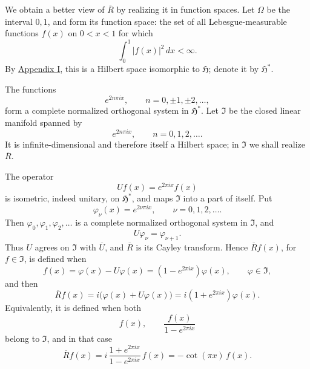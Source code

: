 ﻿\documentclass[paper=b5,fontsize=13pt,bookmarkpackage=false,twoside]{scrartcl}
\begin{document}
We obtain a better view of \(\overline R\) by realizing it in function
spaces.  Let \(\Omega\) be the interval \(0,1\), and form its function
space: the set of all Lebesgue-measurable functions \(f(x)\) on
\(0<x<1\) for which
\[
  \int_0^1|f(x)|^2\,dx<\infty.
\]
By \hyperref[app:I]{Appendix I}, this is a Hilbert space isomorphic to
\(\mathfrak H\); denote it by \(\mathfrak H^*\).

The functions
\[
  e^{2n\pi ix},\qquad n=0,\pm1,\pm2,\ldots,
\]
form a complete normalized orthogonal system in \(\mathfrak H^*\).
Let \(\mathfrak I\) be the closed linear manifold spanned by
\[
  e^{2n\pi ix},\qquad n=0,1,2,\ldots.
\]
It is infinite-dimensional and therefore itself a Hilbert space; in
\(\mathfrak I\) we shall realize \(\overline R\).

The operator
\[
  Uf(x)=e^{2\pi ix}f(x)
\]
is isometric, indeed unitary, on \(\mathfrak H^*\), and maps
\(\mathfrak I\) into a part of itself.  Put
\[
  \varphi_\nu(x)=e^{2\nu\pi ix},\qquad \nu=0,1,2,\ldots.
\]
Then \(\varphi_0,\varphi_1,\varphi_2,\ldots\) is a complete normalized
orthogonal system in \(\mathfrak I\), and
\[
  U\varphi_\nu=\varphi_{\nu+1}.
\]
Thus \(U\) agrees on \(\mathfrak I\) with \(\overline U\), and
\(\overline R\) is its Cayley transform.  Hence
\(\overline Rf(x)\), for \(f\in\mathfrak I\), is defined when
\[
  f(x)=\varphi(x)-U\varphi(x)
      =(1-e^{2\pi ix})\varphi(x),
  \qquad \varphi\in\mathfrak I,
\]
and then
\[
  \overline Rf(x)
  =i\bigl(\varphi(x)+U\varphi(x)\bigr)
  =i(1+e^{2\pi ix})\varphi(x).
\]
Equivalently, it is defined when both
\[
  f(x),\qquad \frac{f(x)}{1-e^{2\pi ix}}
\]
belong to \(\mathfrak I\), and in that case
\[
  \overline Rf(x)
  =i\,\frac{1+e^{2\pi ix}}{1-e^{2\pi ix}}\,f(x)
  =-\cot(\pi x)\,f(x).
\]
\end{document}
